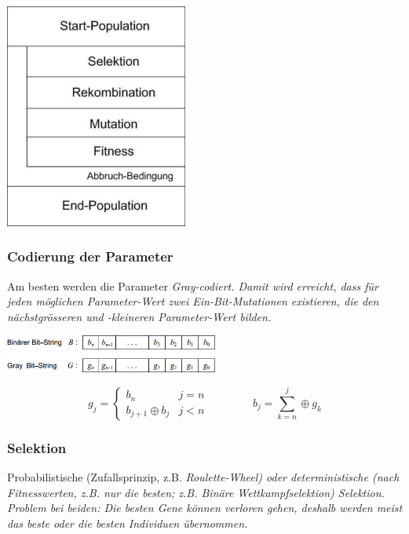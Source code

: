   \begin{minipage}{7cm}
    \begin{flushright}
      \includegraphics[width=6cm]{./Content/MetaHeuristics/GeneticAlgorithms_Principle}
    \end{flushright}
    
    \subsubsection{Codierung der Parameter }
      Am besten werden die Parameter \em Gray\em -codiert. Damit wird erreicht, dass für jeden möglichen Parameter-Wert zwei Ein-Bit-Mutationen existieren, die den nächstgrösseren und -kleineren Parameter-Wert bilden.
      
      \begin{center}
        \includegraphics[width=7cm]{./Content/MetaHeuristics/GeneticAlgorithms_Gray}
      \end{center}
      $$g_j = \begin{cases}
        b_n                & j=n\\
        b_{j+1} \oplus b_j & j < n
        \end{cases} \qquad \qquad 
      b_j = \sum \limits_{k=n}^j \oplus g_k$$
  \end{minipage}
  
\subsubsection{Selektion }
  Probabilistische (Zufallsprinzip, z.B. \em Roulette-Wheel\em ) oder deterministische (nach Fitnesswerten, z.B. nur die besten; z.B. \em Binäre Wettkampfselektion\em ) Selektion. Problem bei beiden: Die besten Gene können verloren gehen, deshalb werden meist das beste oder die besten Individuen übernommen.
  
